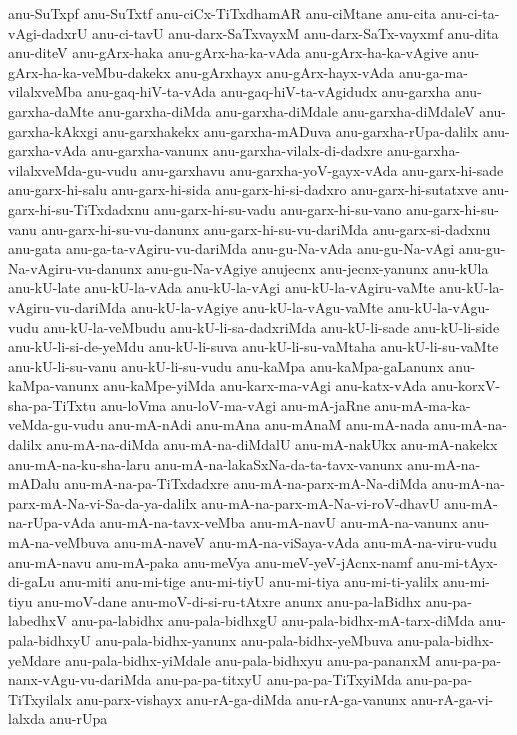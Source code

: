 {anu-SuTxpf
anu-SuTxtf
anu-ciCx-TiTxdhamAR
anu-ciMtane
anu-cita
anu-ci-ta-vAgi-dadxrU
anu-ci-tavU
anu-darx-SaTxvayxM
anu-darx-SaTx-vayxmf
anu-dita
anu-diteV
anu-gArx-haka
anu-gArx-ha-ka-vAda
anu-gArx-ha-ka-vAgive
anu-gArx-ha-ka-veMbu-dakekx
anu-gArxhayx
anu-gArx-hayx-vAda
anu-ga-ma-vilalxveMba
anu-gaq-hiV-ta-vAda
anu-gaq-hiV-ta-vAgidudx
anu-garxha
anu-garxha-daMte
anu-garxha-diMda
anu-garxha-diMdale
anu-garxha-diMdaleV
anu-garxha-kAkxgi
anu-garxhakekx
anu-garxha-mADuva
anu-garxha-rUpa-dalilx
anu-garxha-vAda
anu-garxha-vanunx
anu-garxha-vilalx-di-dadxre
anu-garxha-vilalxveMda-gu-vudu
anu-garxhavu
anu-garxha-yoV-gayx-vAda
anu-garx-hi-sade
anu-garx-hi-salu
anu-garx-hi-sida
anu-garx-hi-si-dadxro
anu-garx-hi-sutatxve
anu-garx-hi-su-TiTxdadxnu
anu-garx-hi-su-vadu
anu-garx-hi-su-vano
anu-garx-hi-su-vanu
anu-garx-hi-su-vu-danunx
anu-garx-hi-su-vu-dariMda
anu-garx-si-dadxnu
anu-gata
anu-ga-ta-vAgiru-vu-dariMda
anu-gu-Na-vAda
anu-gu-Na-vAgi
anu-gu-Na-vAgiru-vu-danunx
anu-gu-Na-vAgiye
anujecnx
anu-jecnx-yanunx
anu-kUla
anu-kU-late
anu-kU-la-vAda
anu-kU-la-vAgi
anu-kU-la-vAgiru-vaMte
anu-kU-la-vAgiru-vu-dariMda
anu-kU-la-vAgiye
anu-kU-la-vAgu-vaMte
anu-kU-la-vAgu-vudu
anu-kU-la-veMbudu
anu-kU-li-sa-dadxriMda
anu-kU-li-sade
anu-kU-li-side
anu-kU-li-si-de-yeMdu
anu-kU-li-suva
anu-kU-li-su-vaMtaha
anu-kU-li-su-vaMte
anu-kU-li-su-vanu
anu-kU-li-su-vudu
anu-kaMpa
anu-kaMpa-gaLanunx
anu-kaMpa-vanunx
anu-kaMpe-yiMda
anu-karx-ma-vAgi
anu-katx-vAda
anu-korxV-sha-pa-TiTxtu
anu-loVma
anu-loV-ma-vAgi
anu-mA-jaRne
anu-mA-ma-ka-veMda-gu-vudu
anu-mA-nAdi
anu-mAna
anu-mAnaM
anu-mA-nada
anu-mA-na-dalilx
anu-mA-na-diMda
anu-mA-na-diMdalU
anu-mA-nakUkx
anu-mA-nakekx
anu-mA-na-ku-sha-laru
anu-mA-na-lakaSxNa-da-ta-tavx-vanunx
anu-mA-na-mADalu
anu-mA-na-pa-TiTxdadxre
anu-mA-na-parx-mA-Na-diMda
anu-mA-na-parx-mA-Na-vi-Sa-da-ya-dalilx
anu-mA-na-parx-mA-Na-vi-roV-dhavU
anu-mA-na-rUpa-vAda
anu-mA-na-tavx-veMba
anu-mA-navU
anu-mA-na-vanunx
anu-mA-na-veMbuva
anu-mA-naveV
anu-mA-na-viSaya-vAda
anu-mA-na-viru-vudu
anu-mA-navu
anu-mA-paka
anu-meVya
anu-meV-yeV-jAcnx-namf
anu-mi-tAyx-di-gaLu
anu-miti
anu-mi-tige
anu-mi-tiyU
anu-mi-tiya
anu-mi-ti-yalilx
anu-mi-tiyu
anu-moV-dane
anu-moV-di-si-ru-tAtxre
anunx
anu-pa-laBidhx
anu-pa-labedhxV
anu-pa-labidhx
anu-pala-bidhxgU
anu-pala-bidhx-mA-tarx-diMda
anu-pala-bidhxyU
anu-pala-bidhx-yanunx
anu-pala-bidhx-yeMbuva
anu-pala-bidhx-yeMdare
anu-pala-bidhx-yiMdale
anu-pala-bidhxyu
anu-pa-pananxM
anu-pa-pa-nanx-vAgu-vu-dariMda
anu-pa-pa-titxyU
anu-pa-pa-TiTxyiMda
anu-pa-pa-TiTxyilalx
anu-parx-vishayx
anu-rA-ga-diMda
anu-rA-ga-vanunx
anu-rA-ga-vi-lalxda
anu-rUpa
}
